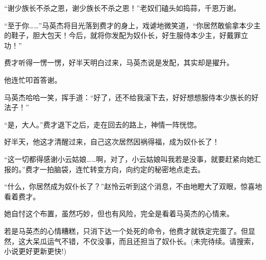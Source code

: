 \begin{this_body}
“谢少族长不杀之恩，谢少族长不杀之恩！”老奴们磕头如捣蒜，千恩万谢。

“至于你……”马英杰将目光落到费才的身上，戏谑地微笑道，“你居然敢偷拿本少主的鞋子，胆大包天！今后，就将你发配为奴仆长，好生服侍本少主，好戴罪立功！”

费才听得一愣一愣，好半天明白过来，马英杰说是发配，其实却是擢升。

他连忙叩首答谢。

马英杰哈哈一笑，挥手道：“好了，还不给我滚下去，好好想想服侍本少族长的好法子！”

“是，大人。”费才退下之后，走在回去的路上，神情一阵恍惚。

好半天，他这才清醒过来，自己这次居然因祸得福，成为奴仆长了！

“这一切都得感谢小云姑娘……啊，对了，小云姑娘叫我若是没事，就要赶紧向她汇报的。”费才一拍脑袋，连忙转变方向，向约定的秘密地点走去。

“什么，你居然成为奴仆长了？”赵怜云听到这个消息，不由地瞪大了双眼，惊喜地看着费才。

她自忖这个布置，虽然巧妙，但也有风险，完全是看着马英杰的心情来。

若是马英杰的心情糟糕，只消下达一个处死的命令，他费才就铁定完蛋了。但显然，这大呆瓜运气不错，不仅没事，而且还担当了奴仆长。(未完待续。请搜索，小说更好更新更快!)

\end{this_body}

